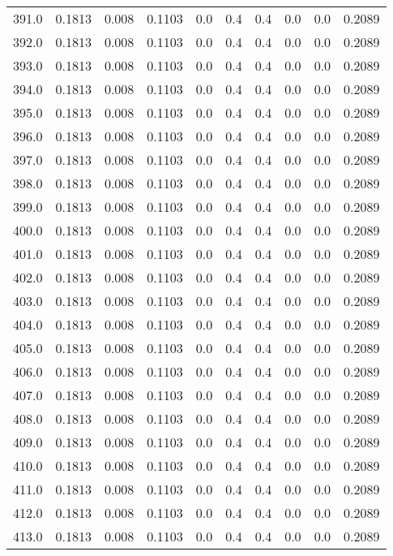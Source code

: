 \begin{longtable}{lrrrrrrrrr}
391.0 & 0.1813 & 0.008 & 0.1103 & 0.0 & 0.4 & 0.4 & 0.0 & 0.0 & 0.2089 \\
392.0 & 0.1813 & 0.008 & 0.1103 & 0.0 & 0.4 & 0.4 & 0.0 & 0.0 & 0.2089 \\
393.0 & 0.1813 & 0.008 & 0.1103 & 0.0 & 0.4 & 0.4 & 0.0 & 0.0 & 0.2089 \\
394.0 & 0.1813 & 0.008 & 0.1103 & 0.0 & 0.4 & 0.4 & 0.0 & 0.0 & 0.2089 \\
395.0 & 0.1813 & 0.008 & 0.1103 & 0.0 & 0.4 & 0.4 & 0.0 & 0.0 & 0.2089 \\
396.0 & 0.1813 & 0.008 & 0.1103 & 0.0 & 0.4 & 0.4 & 0.0 & 0.0 & 0.2089 \\
397.0 & 0.1813 & 0.008 & 0.1103 & 0.0 & 0.4 & 0.4 & 0.0 & 0.0 & 0.2089 \\
398.0 & 0.1813 & 0.008 & 0.1103 & 0.0 & 0.4 & 0.4 & 0.0 & 0.0 & 0.2089 \\
399.0 & 0.1813 & 0.008 & 0.1103 & 0.0 & 0.4 & 0.4 & 0.0 & 0.0 & 0.2089 \\
400.0 & 0.1813 & 0.008 & 0.1103 & 0.0 & 0.4 & 0.4 & 0.0 & 0.0 & 0.2089 \\
401.0 & 0.1813 & 0.008 & 0.1103 & 0.0 & 0.4 & 0.4 & 0.0 & 0.0 & 0.2089 \\
402.0 & 0.1813 & 0.008 & 0.1103 & 0.0 & 0.4 & 0.4 & 0.0 & 0.0 & 0.2089 \\
403.0 & 0.1813 & 0.008 & 0.1103 & 0.0 & 0.4 & 0.4 & 0.0 & 0.0 & 0.2089 \\
404.0 & 0.1813 & 0.008 & 0.1103 & 0.0 & 0.4 & 0.4 & 0.0 & 0.0 & 0.2089 \\
405.0 & 0.1813 & 0.008 & 0.1103 & 0.0 & 0.4 & 0.4 & 0.0 & 0.0 & 0.2089 \\
406.0 & 0.1813 & 0.008 & 0.1103 & 0.0 & 0.4 & 0.4 & 0.0 & 0.0 & 0.2089 \\
407.0 & 0.1813 & 0.008 & 0.1103 & 0.0 & 0.4 & 0.4 & 0.0 & 0.0 & 0.2089 \\
408.0 & 0.1813 & 0.008 & 0.1103 & 0.0 & 0.4 & 0.4 & 0.0 & 0.0 & 0.2089 \\
409.0 & 0.1813 & 0.008 & 0.1103 & 0.0 & 0.4 & 0.4 & 0.0 & 0.0 & 0.2089 \\
410.0 & 0.1813 & 0.008 & 0.1103 & 0.0 & 0.4 & 0.4 & 0.0 & 0.0 & 0.2089 \\
411.0 & 0.1813 & 0.008 & 0.1103 & 0.0 & 0.4 & 0.4 & 0.0 & 0.0 & 0.2089 \\
412.0 & 0.1813 & 0.008 & 0.1103 & 0.0 & 0.4 & 0.4 & 0.0 & 0.0 & 0.2089 \\
413.0 & 0.1813 & 0.008 & 0.1103 & 0.0 & 0.4 & 0.4 & 0.0 & 0.0 & 0.2089 \\

\end{longtable}
